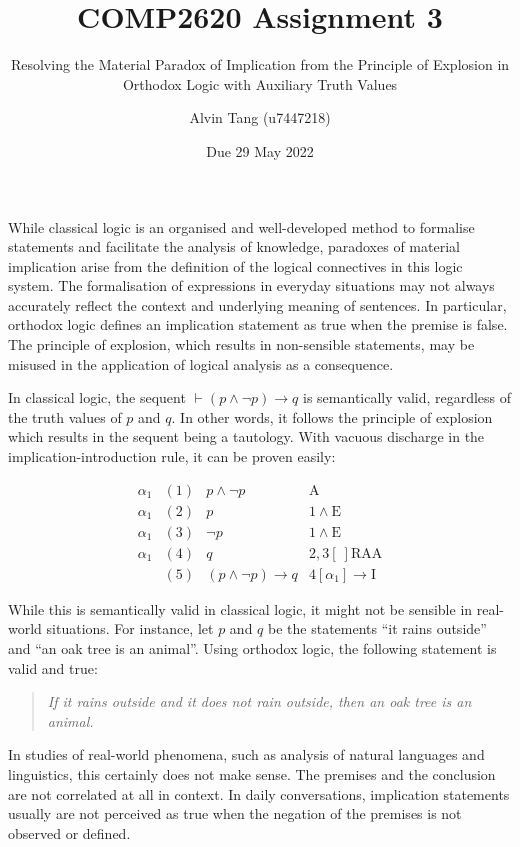 \documentclass{article}
\title{COMP2620 Assignment 3}
\subtitle {Resolving the Material Paradox of Implication from the Principle of
Explosion in Orthodox Logic with Auxiliary Truth Values}
\author{Alvin Tang (u7447218)}
\date{Due 29 May 2022}
\begin{document}
\maketitle

While classical logic is an organised and well-developed method to formalise
statements and facilitate the analysis of knowledge, paradoxes of material
implication arise from the definition of the logical connectives in this logic
system. The formalisation of expressions in everyday situations may not always
accurately reflect the context and underlying meaning of sentences. In
particular, orthodox logic defines an implication statement as true when the 
premise is false. The principle of explosion, which results in non-sensible
statements, may be misused in the application of logical analysis as a
consequence.

\bigskip

In classical logic, the sequent $\vdash (p \land \neg p) \to q$ is semantically
valid, regardless of the truth values of $p$ and $q$. In other words, it
follows the principle of explosion which results in the sequent being a
tautology. With vacuous discharge in the implication-introduction rule, it can
be proven easily:

\begin{equation*}
\begin{matrix}
    \alpha_{1} & (1) & p \land \neg p & \text{A}\\
    \alpha_{1} & (2) & p & 1 \land \text{E}\\
    \alpha_{1} & (3) & \neg p & 1 \land \text{E}\\
    \alpha_{1} & (4) & q & 2,3[\ ]\text{RAA}\\
    & (5) & (p \land \neg p) \to q & 4[\alpha_{1}] \to \text{I}
\end{matrix}
\end{equation*}

While this is semantically valid in classical logic, it might not be sensible
in real-world situations. For instance, let $p$ and $q$ be the statements
``it rains outside'' and ``an oak tree is an animal''. Using orthodox logic, the
following statement is valid and true:
\begin{quote}
    \textit{If it rains outside and it does not rain outside, then an oak tree
    is an animal.}
\end{quote}

In studies of real-world phenomena, such as analysis of natural languages and
linguistics{\cite{Stanford}}, this certainly does not make sense. The premises
and the conclusion are not correlated at all in context. In daily conversations,
 implication statements usually are not perceived as true when the negation of
 the premises is not observed or defined.
\end{document}
